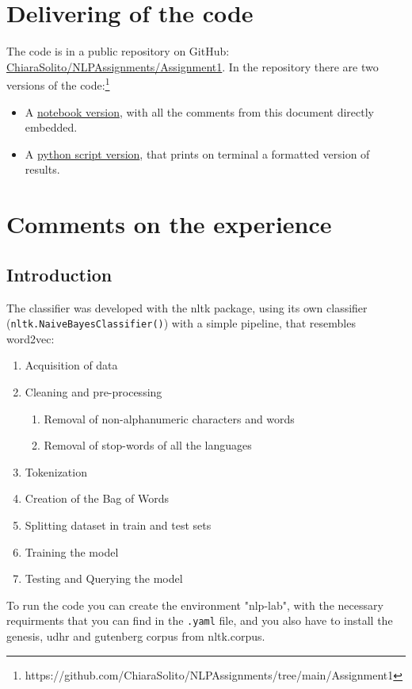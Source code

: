 \documentclass{article}
\begin{document}
    \section{Delivering of the code}
    The code is in a public repository on GitHub:\\
    \href{https://github.com/ChiaraSolito/NLPAssignments/tree/main/Assignment1}{ChiaraSolito/NLPAssignments/Assignment1}. In the repository there are two versions of the code:\footnote{https://github.com/ChiaraSolito/NLPAssignments/tree/main/Assignment1}
        \begin{itemize}
            \item A \href{https://github.com/ChiaraSolito/NLPAssignments/blob/main/Assignment1/firstAssignment.ipynb}{notebook version}, with all the comments from this document directly embedded.
            \item A \href{https://github.com/ChiaraSolito/NLPAssignments/blob/main/Assignment1/firstAssignment.py}{python script version}, that prints on terminal a formatted version of results.
        \end{itemize}

    \section{Comments on the experience}
        \subsection{Introduction}
        The classifier was developed with the nltk package, using its own classifier (\texttt{nltk.NaiveBayesClassifier()}) with a simple pipeline, that resembles word2vec:
            \begin{enumerate}
                \item Acquisition of data
                \item Cleaning and pre-processing 
                    \begin{enumerate}
                        \item Removal of non-alphanumeric characters and words 
                        \item Removal of stop-words of all the languages
                    \end{enumerate}
                \item Tokenization 
                \item Creation of the Bag of Words 
                \item Splitting dataset in train and test sets 
                \item Training the model 
                \item Testing and Querying the model
            \end{enumerate}
        To run the code you can create the environment "nlp-lab", with the necessary requirments that you can find in the \texttt{.yaml} file, and you also have to install the genesis, udhr and gutenberg corpus from nltk.corpus.
\end{document}
